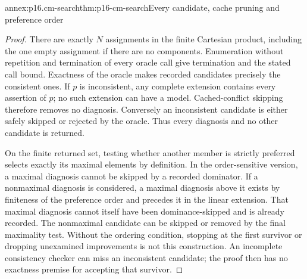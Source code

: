 \begin{annexitem}{annex:p16.cm-search}{thm:p16-cm-search}{Every candidate, cache pruning and preference order}
\begin{proof}
There are exactly \(N\) assignments in the finite Cartesian product,
including the one empty assignment if there are no components. Enumeration
without repetition and termination of every oracle call give termination
and the stated call bound. Exactness of the oracle makes recorded candidates
precisely the consistent ones. If \(p\) is inconsistent, any complete
extension contains every assertion of \(p\); no such extension can have
a model. Cached-conflict skipping therefore removes no diagnosis. Conversely
an inconsistent candidate is either safely skipped or rejected by the oracle.
Thus every diagnosis and no other candidate is returned.

On the finite returned set, testing whether another member is strictly
preferred selects exactly its maximal elements by definition. In the
order-sensitive version, a maximal diagnosis cannot be skipped by a recorded
dominator. If a nonmaximal diagnosis is considered, a maximal diagnosis above
it exists by finiteness of the preference order and precedes it in the linear
extension. That maximal diagnosis cannot itself have been dominance-skipped
and is already recorded. The nonmaximal candidate can be skipped or removed
by the final maximality test. Without the ordering condition, stopping at the
first survivor or dropping unexamined improvements is not this construction.
An incomplete consistency checker can miss an inconsistent candidate; the
proof then has no exactness premise for accepting that survivor.
\end{proof}
\end{annexitem}

